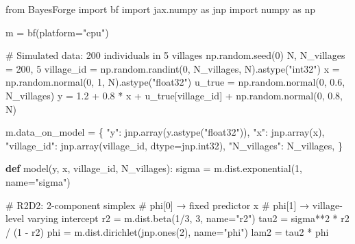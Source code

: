 \documentclass[
  letterpaper,
  DIV=11,
  numbers=noendperiod]{scrartcl}
\newenvironment{Shaded}{\begin{snugshade}}{\end{snugshade}}
\newcommand{\CommentTok}[1]{\textcolor[rgb]{0.37,0.37,0.37}{#1}}
\newcommand{\DecValTok}[1]{\textcolor[rgb]{0.68,0.00,0.00}{#1}}
\newcommand{\FloatTok}[1]{\textcolor[rgb]{0.68,0.00,0.00}{#1}}
\newcommand{\ImportTok}[1]{\textcolor[rgb]{0.00,0.46,0.62}{#1}}
\newcommand{\KeywordTok}[1]{\textcolor[rgb]{0.00,0.23,0.31}{\textbf{#1}}}
\newcommand{\NormalTok}[1]{\textcolor[rgb]{0.00,0.23,0.31}{#1}}
\newcommand{\OperatorTok}[1]{\textcolor[rgb]{0.37,0.37,0.37}{#1}}
\newcommand{\StringTok}[1]{\textcolor[rgb]{0.13,0.47,0.30}{#1}}
\begin{document}
\begin{Shaded}
\begin{Highlighting}[]
\ImportTok{from}\NormalTok{ BayesForge }\ImportTok{import}\NormalTok{ bf}
\ImportTok{import}\NormalTok{ jax.numpy }\ImportTok{as}\NormalTok{ jnp}
\ImportTok{import}\NormalTok{ numpy }\ImportTok{as}\NormalTok{ np}

\NormalTok{m }\OperatorTok{=}\NormalTok{ bf(platform}\OperatorTok{=}\StringTok{"cpu"}\NormalTok{)}

\CommentTok{\# Simulated data: 200 individuals in 5 villages}
\NormalTok{np.random.seed(}\DecValTok{0}\NormalTok{)}
\NormalTok{N, N\_villages }\OperatorTok{=} \DecValTok{200}\NormalTok{, }\DecValTok{5}
\NormalTok{village\_id }\OperatorTok{=}\NormalTok{ np.random.randint(}\DecValTok{0}\NormalTok{, N\_villages, N).astype(}\StringTok{"int32"}\NormalTok{)}
\NormalTok{x         }\OperatorTok{=}\NormalTok{ np.random.normal(}\DecValTok{0}\NormalTok{, }\DecValTok{1}\NormalTok{, N).astype(}\StringTok{"float32"}\NormalTok{)}
\NormalTok{u\_true    }\OperatorTok{=}\NormalTok{ np.random.normal(}\DecValTok{0}\NormalTok{, }\FloatTok{0.6}\NormalTok{, N\_villages)}
\NormalTok{y         }\OperatorTok{=} \FloatTok{1.2} \OperatorTok{+} \FloatTok{0.8} \OperatorTok{*}\NormalTok{ x }\OperatorTok{+}\NormalTok{ u\_true[village\_id] }\OperatorTok{+}\NormalTok{ np.random.normal(}\DecValTok{0}\NormalTok{, }\FloatTok{0.8}\NormalTok{, N)}

\NormalTok{m.data\_on\_model }\OperatorTok{=}\NormalTok{ \{}
    \StringTok{"y"}\NormalTok{:          jnp.array(y.astype(}\StringTok{"float32"}\NormalTok{)),}
    \StringTok{"x"}\NormalTok{:          jnp.array(x),}
    \StringTok{"village\_id"}\NormalTok{: jnp.array(village\_id, dtype}\OperatorTok{=}\NormalTok{jnp.int32),}
    \StringTok{"N\_villages"}\NormalTok{: N\_villages,}
\NormalTok{\}}

\KeywordTok{def}\NormalTok{ model(y, x, village\_id, N\_villages):}
\NormalTok{    sigma }\OperatorTok{=}\NormalTok{ m.dist.exponential(}\DecValTok{1}\NormalTok{, name}\OperatorTok{=}\StringTok{"sigma"}\NormalTok{)}

    \CommentTok{\# R2D2: 2{-}component simplex}
    \CommentTok{\#   phi[0] → fixed predictor x}
    \CommentTok{\#   phi[1] → village{-}level varying intercept}
\NormalTok{    r2   }\OperatorTok{=}\NormalTok{ m.dist.beta(}\DecValTok{1}\OperatorTok{/}\DecValTok{3}\NormalTok{, }\DecValTok{3}\NormalTok{, name}\OperatorTok{=}\StringTok{"r2"}\NormalTok{)}
\NormalTok{    tau2 }\OperatorTok{=}\NormalTok{ sigma}\OperatorTok{**}\DecValTok{2} \OperatorTok{*}\NormalTok{ r2 }\OperatorTok{/}\NormalTok{ (}\DecValTok{1} \OperatorTok{{-}}\NormalTok{ r2)}
\NormalTok{    phi  }\OperatorTok{=}\NormalTok{ m.dist.dirichlet(jnp.ones(}\DecValTok{2}\NormalTok{), name}\OperatorTok{=}\StringTok{"phi"}\NormalTok{)}
\NormalTok{    lam2 }\OperatorTok{=}\NormalTok{ tau2 }\OperatorTok{*}\NormalTok{ phi}


\end{Highlighting}
\end{Shaded}
\end{document}
